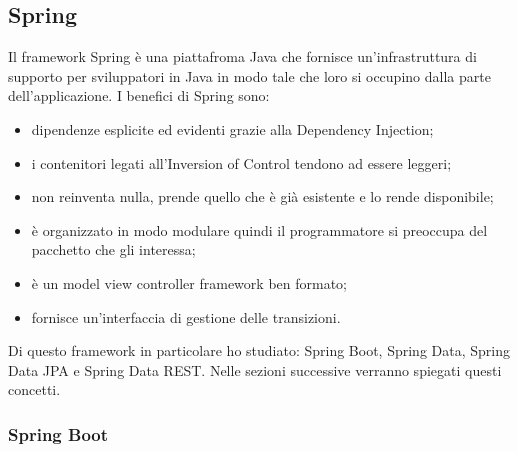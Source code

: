 \subsection{Spring}

Il framework Spring è una piattafroma Java che fornisce un'infrastruttura di supporto per sviluppatori in Java in modo tale che loro si occupino dalla parte dell'applicazione. I benefici di Spring sono:
\begin{itemize}
	\item dipendenze esplicite ed evidenti grazie alla Dependency Injection;
	\item i contenitori legati all'Inversion of Control tendono ad essere leggeri;
	\item non reinventa nulla, prende quello che è già esistente e lo rende disponibile;
	\item è organizzato in modo modulare quindi il programmatore si preoccupa del pacchetto che gli interessa;
	\item è un model view controller framework ben formato;
	\item fornisce un'interfaccia di gestione delle transizioni.
\end{itemize}
Di questo framework in particolare ho studiato: Spring Boot, Spring Data, Spring Data JPA e Spring Data REST. Nelle sezioni successive verranno spiegati questi concetti.

\subsubsection{Spring Boot}

